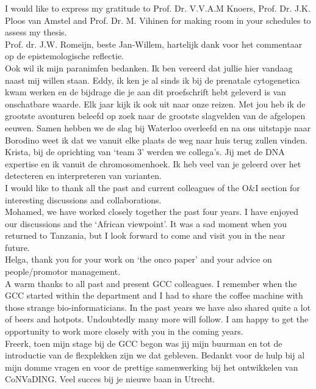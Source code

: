 \begin{appendices}
	\noindent I would like to express my gratitude to Prof. Dr. V.V.A.M Knoers, Prof. Dr. J.K. Ploos van Amstel and Prof. Dr. M. Vihinen for making room in your schedules to assess my thesis.\\ 
	
	\noindent Prof. dr. J.W. Romeijn, beste Jan-Willem, hartelijk dank voor het commentaar op de epistemologische reflectie.\\
	
	\noindent Ook wil ik mijn paranimfen bedanken. Ik ben vereerd dat jullie hier vandaag naast mij willen staan. Eddy, ik ken je al sinds ik bij de prenatale cytogenetica kwam werken en de bijdrage die je aan dit proefschrift hebt geleverd is van onschatbare waarde. Elk jaar kijk ik ook uit naar onze reizen. Met jou heb ik de grootste avonturen beleefd op zoek naar de grootste slagvelden van de afgelopen eeuwen. Samen hebben we de slag bij Waterloo overleefd en na ons uitstapje naar Borodino weet ik dat we vanuit elke plaats de weg naar huis terug zullen vinden. Krista, bij de oprichting van ‘team 3’ werden we collega’s. Jij met de DNA expertise en ik vanuit de chromosomenhoek. Ik heb veel van je geleerd over het detecteren en interpreteren van varianten.\\ 
	
	\noindent I would like to thank all the past and current colleagues of the O\&I section for interesting discussions and collaborations.\\ 
	
	\noindent Mohamed, we have worked closely together the past four years. I have enjoyed our discussions and the ‘African viewpoint’. It was a sad moment when you returned to Tanzania, but I look forward to come and visit you in the near future.\\
	
	\noindent Helga, thank you for your work on ‘the onco paper’ and your advice on people/promotor management.\\
	
	\noindent A warm thanks to all past and present GCC colleagues. I remember when the GCC started within the department and I had to share the coffee machine with those strange bio-informaticians. In the past years we have also shared quite a lot of beers and hotpots. Undoubtedly many more will follow. I am happy to get the opportunity to work more closely with you in the coming years.\\
	
	\noindent Freerk, toen mijn stage bij de GCC begon was jij mijn buurman en tot de introductie van de flexplekken zijn we dat gebleven. Bedankt voor de hulp bij al mijn domme vragen en voor de prettige samenwerking bij het ontwikkelen van CoNVaDING. Veel succes bij je nieuwe baan in Utrecht.\\
	

\end{appendices}
